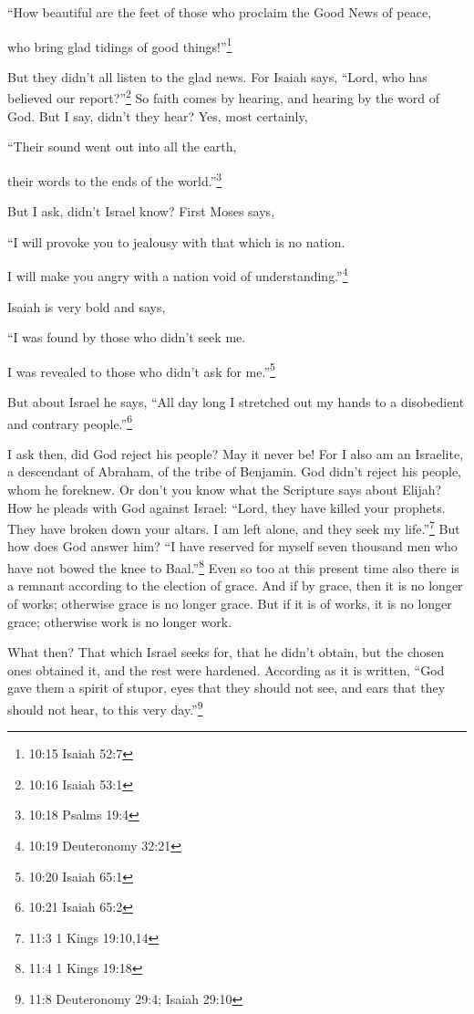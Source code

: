 “How beautiful are the feet of those who proclaim the Good News of peace,

who bring glad tidings of good things!”\footnote{10:15 Isaiah 52:7}

\myverse{}But they didn’t all listen to the glad news. For Isaiah says,
“Lord, who has believed our report?”\footnote{10:16 Isaiah 53:1}
\myverse{}So faith comes by hearing, and hearing by the word of God.
\myverse{}But I say, didn’t they hear? Yes, most certainly,

“Their sound went out into all the earth,

their words to the ends of the world.”\footnote{10:18 Psalms 19:4}

\myverse{}But I ask, didn’t Israel know? First Moses says,

“I will provoke you to jealousy with that which is no nation.

I will make you angry with a nation void of understanding.”\footnote{10:19 Deuteronomy 32:21}

\myverse{}Isaiah is very bold and says,

“I was found by those who didn’t seek me.

I was revealed to those who didn’t ask for me.”\footnote{10:20 Isaiah 65:1}

\myverse{}But about Israel he says, “All day long I stretched out my hands
to a disobedient and contrary people.”\footnote{10:21 Isaiah 65:2}


\mychapter{} \myverse*{}I ask then, did God reject his people? May it never be! For I
also am an Israelite, a descendant of Abraham, of the tribe of Benjamin.
\myverse{}God didn’t reject his people, whom he foreknew. Or don’t you know what the
Scripture says about Elijah? How he pleads with God against Israel:
\myverse{}“Lord, they have killed your prophets. They have broken down your altars. I
am left alone, and they seek my life.”\footnote{11:3 1 Kings 19:10,14}
\myverse{}But how does God answer him? “I have reserved for myself seven thousand men
who have not bowed the knee to Baal.”\footnote{11:4 1 Kings 19:18}
\myverse{}Even so too at this present time also there is a remnant according to the election
of grace.
\myverse{}And if by grace, then it is no longer of works; otherwise grace is no longer
grace. But if it is of works, it is no longer grace; otherwise work is no longer work.

\myverse{}What then? That which Israel seeks for, that he didn’t obtain,
but the chosen ones obtained it, and the rest were hardened.
\myverse{}According as it is written, “God gave them a spirit of stupor, eyes that they
should not see, and ears that they should not hear, to this very day.”\footnote{11:8 Deuteronomy 29:4;
	Isaiah 29:10}

